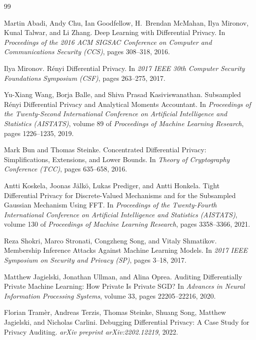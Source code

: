 \documentclass[10pt]{article}
\begin{document}
\begin{thebibliography}{99}

Martin Abadi, Andy Chu, Ian Goodfellow, H.~Brendan McMahan, Ilya Mironov, Kunal Talwar, and Li Zhang.
\newblock Deep Learning with Differential Privacy.
\newblock In \emph{Proceedings of the 2016 ACM SIGSAC Conference on Computer and Communications Security (CCS)}, pages 308--318, 2016.

Ilya Mironov.
\newblock R\'enyi Differential Privacy.
\newblock In \emph{2017 IEEE 30th Computer Security Foundations Symposium (CSF)}, pages 263--275, 2017.

Yu-Xiang Wang, Borja Balle, and Shiva Prasad Kasiviswanathan.
\newblock Subsampled R\'enyi Differential Privacy and Analytical Moments Accountant.
\newblock In \emph{Proceedings of the Twenty-Second International Conference on Artificial Intelligence and Statistics (AISTATS)}, volume 89 of \emph{Proceedings of Machine Learning Research}, pages 1226--1235, 2019.

Mark Bun and Thomas Steinke.
\newblock Concentrated Differential Privacy: Simplifications, Extensions, and Lower Bounds.
\newblock In \emph{Theory of Cryptography Conference (TCC)}, pages 635--658, 2016.

Antti Koskela, Joonas J\"alk\"o, Lukas Prediger, and Antti Honkela.
\newblock Tight Differential Privacy for Discrete-Valued Mechanisms and for the Subsampled Gaussian Mechanism Using FFT.
\newblock In \emph{Proceedings of the Twenty-Fourth International Conference on Artificial Intelligence and Statistics (AISTATS)}, volume 130 of \emph{Proceedings of Machine Learning Research}, pages 3358--3366, 2021.

Reza Shokri, Marco Stronati, Congzheng Song, and Vitaly Shmatikov.
\newblock Membership Inference Attacks Against Machine Learning Models.
\newblock In \emph{2017 IEEE Symposium on Security and Privacy (SP)}, pages 3--18, 2017.

Matthew Jagielski, Jonathan Ullman, and Alina Oprea.
\newblock Auditing Differentially Private Machine Learning: How Private Is Private SGD?
\newblock In \emph{Advances in Neural Information Processing Systems}, volume 33, pages 22205--22216, 2020.

Florian Tram\`er, Andreas Terzis, Thomas Steinke, Shuang Song, Matthew Jagielski, and Nicholas Carlini.
\newblock Debugging Differential Privacy: A Case Study for Privacy Auditing.
\newblock \emph{arXiv preprint arXiv:2202.12219}, 2022.


\end{thebibliography}
\end{document}
